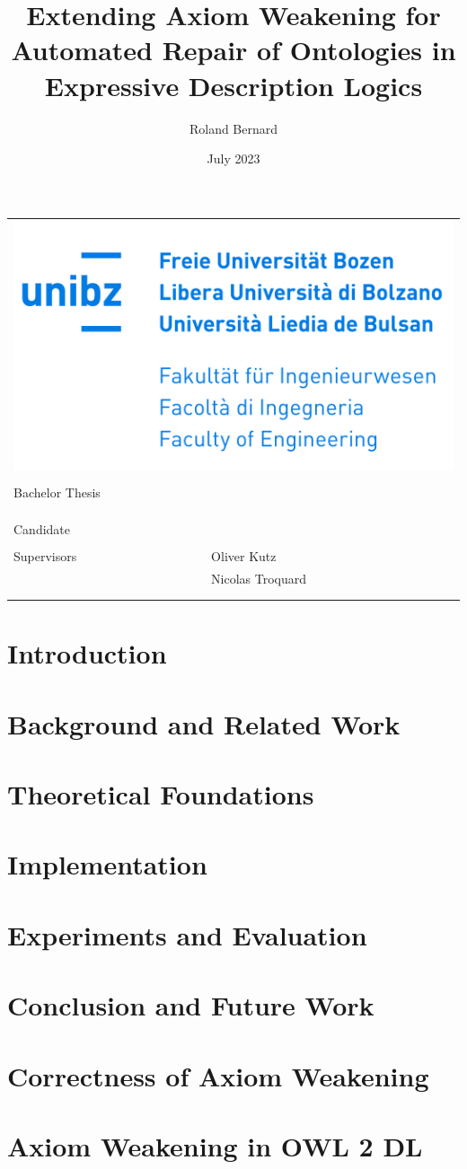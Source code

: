 \documentclass[10pt,a4paper]{report}
\title{Extending Axiom Weakening for Automated Repair of Ontologies in Expressive Description Logics}
\author{Roland Bernard}
\date{July 2023}
\makeatletter
\theoremstyle{plain}
\theoremstyle{definition}
\theoremstyle{remark}
\def\maketitle{
    \begin{tabular}{ll}
        \multicolumn{2}{r}{\includegraphics[width=0.5\linewidth]{resources/unibz-logo.png}} \\
        \vspace*{40mm} \\
        \multicolumn{2}{l}{\raggedright Bachelor Thesis} \\
        \vspace*{1mm} \\
        \multicolumn{2}{p{\linewidth}}{\raggedright \huge \bf \@title} \\
        \vspace*{30mm} \\
        Candidate   & \@author \\
        \vspace*{5mm} \\
        Supervisors & Oliver Kutz \\
                    & Nicolas Troquard \\
        \vspace*{20mm} \\
        \multicolumn{2}{p{\linewidth}}{\@date}
    \end{tabular}
}
\makeatother
\begin{document}
\maketitle

\begin{abstract}
    
\end{abstract}

\tableofcontents

\begingroup
\renewcommand{\abstractname}{Acknowledgements}
\begin{abstract}
    
\end{abstract}
\endgroup

\chapter{Introduction} \label{introduction}



\chapter{Background and Related Work} \label{background}



\chapter{Theoretical Foundations} \label{theory}



\chapter{Implementation} \label{implementation}



\chapter{Experiments and Evaluation} \label{evaluation}



\chapter{Conclusion and Future Work} \label{conclusion}



\printbibliography

\appendix

\chapter{Correctness of Axiom Weakening} \label{proof-weakening}



\chapter{Axiom Weakening in OWL 2 DL} \label{weakening-owl-2-dl}


\end{document}
